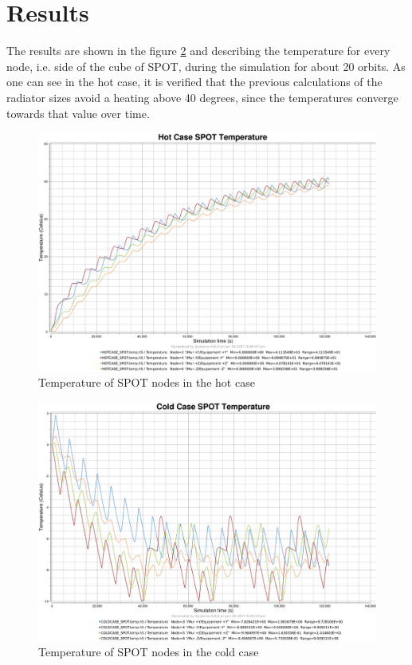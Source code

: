 \section{Results}
The results are shown in the figure \ref{fig:spothot} and describing the temperature for every node, i.e. side of the cube of SPOT, during the simulation for about 20 orbits. As one can see in the hot case, it is verified that the previous calculations of the radiator sizes avoid a heating above 40 degrees, since the temperatures converge towards that value over time. 
\begin{figure}[H]
	\centering
	\includegraphics[scale=0.15]{images/SPOT_hotcase_temperature.png}
	\caption{Temperature of SPOT nodes in the hot case}
	\label{fig:spothot}
\end{figure}

\begin{figure}[H]
	\centering
	\includegraphics[scale=0.15]{images/SPOT_coldcase_temperature.png}
	\caption{Temperature of SPOT nodes in the cold case}
	\label{fig:spothot}
\end{figure}


